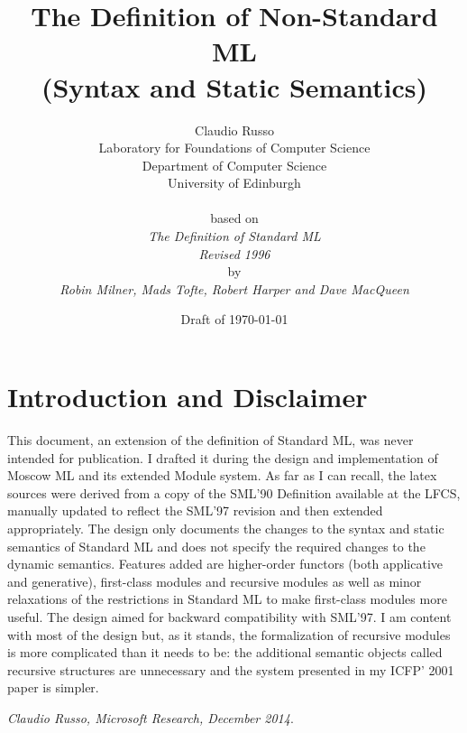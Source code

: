 \documentclass[12pt,twoside]{article}
\title{The Definition of Non-Standard ML\\
        (Syntax and Static Semantics) }
\date{Draft of \today}
\author{Claudio Russo \\
Laboratory for Foundations of Computer Science\\
Department of Computer Science\\
University of Edinburgh\\
\vspace{3ex}\\         
based on \\ 
{\sl The Definition of Standard ML} \\
{\sl Revised 1996} \\
by \\
{\sl   Robin Milner, Mads Tofte, Robert Harper and Dave MacQueen}\\
}
\begin{document}
\pagestyle{empty}
\maketitle
\cleardoublepage
\pagestyle{plain}
\setcounter{page}{3}
\renewcommand{\thepage}{\roman{page}}



\tableofcontents
\cleardoublepage
\pagestyle{headings}
\setcounter{page}{1}
\renewcommand{\thepage}{\arabic{page}}

\section{Introduction and Disclaimer}
This document, an extension of the definition of Standard ML, was never intended for publication. 
I drafted it during the design and implementation of Moscow ML and its extended Module system.
As far as I can recall, the latex sources were derived from a copy of the SML'90 Definition available at the LFCS,  manually updated to reflect the SML'97  revision
and then extended appropriately. The design only documents the changes to the syntax and static semantics of Standard ML and does not specify the required changes
to the dynamic semantics. Features added are higher-order functors (both applicative and generative), first-class modules and recursive modules  as well as minor
relaxations of the restrictions in Standard ML to make first-class modules more useful. The design aimed for backward compatibility with SML'97.
I am content with most of the design but, as it stands, the formalization of recursive modules is more complicated than it needs to be:
 the additional semantic objects called recursive structures are unnecessary and the system presented in my ICFP' 2001 paper is simpler.

{\it Claudio Russo, Microsoft Research, December 2014}. 








% 
% 
% 
\appendix


% 
% 
% 
% 
% 
\end{document}
